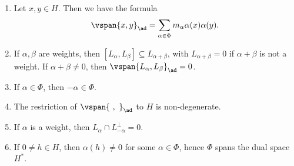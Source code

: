 \begin{enumerate}[label=(\alph*)]
	\item Let $x, y \in H$. Then we have the formula
		\[ \vspan{x, y}_{\ad} = \sum_{\alpha \in \Phi} m_\alpha \alpha(x)\alpha(y). \]
	\item If $\alpha, \beta$ are weights, then $[L_\alpha, L_\beta] \subseteq L_{\alpha+\beta}$,
		with $L_{\alpha+\beta} = 0$ if $\alpha+\beta$ is not a weight.
		If $\alpha+\beta \neq 0$, then  $\vspan{L_{\alpha}, L_{\beta}}_{\ad} = 0$.
	\item If $\alpha \in \Phi$, then $-\alpha \in \Phi$.
	\item The restriction of $\vspan{\ ,\ }_{\ad}$ to $H$ is non-degenerate.
	\item If $\alpha$ is a weight, then $L_{\alpha}\cap L_{-\alpha}^\perp = 0$.
	\item If $0\neq h \in H$, then $\alpha(h)\neq 0$ for some $\alpha \in \Phi$,
		hence $\Phi$ spans the dual space $H^*$.
\end{enumerate}
